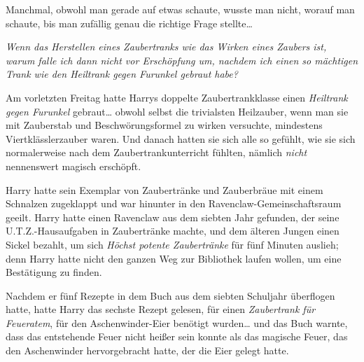 Manchmal, obwohl man gerade auf etwas schaute, wusste man nicht, worauf man schaute, bis man zufällig genau die richtige Frage stellte…

\emph{Wenn das Herstellen eines Zaubertranks wie das Wirken eines Zaubers ist, warum falle ich dann nicht vor Erschöpfung um, nachdem ich einen so mächtigen Trank wie den Heiltrank gegen Furunkel gebraut habe?}

Am vorletzten Freitag hatte Harrys doppelte Zaubertrankklasse einen \emph{Heiltrank gegen Furunkel} gebraut… obwohl selbst die trivialsten Heilzauber, wenn man sie mit Zauberstab und Beschwörungsformel zu wirken versuchte, mindestens Viertklässlerzauber waren. Und danach hatten sie sich alle so gefühlt, wie sie sich normalerweise nach dem Zaubertrankunterricht fühlten, nämlich \emph{nicht} nennenswert magisch erschöpft.

Harry hatte sein Exemplar von Zaubertränke und Zauberbräue mit einem Schnalzen zugeklappt und war hinunter in den Ravenclaw-Gemeinschaftsraum geeilt. Harry hatte einen Ravenclaw aus dem siebten Jahr gefunden, der seine U.T.Z.-Hausaufgaben in Zaubertränke machte, und dem älteren Jungen einen Sickel bezahlt, um sich \emph{Höchst potente Zaubertränke} für fünf Minuten auslieh; denn Harry hatte nicht den ganzen Weg zur Bibliothek laufen wollen, um eine Bestätigung zu finden.

Nachdem er fünf Rezepte in dem Buch aus dem siebten Schuljahr überflogen hatte, hatte Harry das sechste Rezept gelesen, für einen \emph{Zaubertrank für Feueratem}, für den Aschenwinder-Eier benötigt wurden… und das Buch warnte, dass das entstehende Feuer nicht heißer sein konnte als das magische Feuer, das den Aschenwinder hervorgebracht hatte, der die Eier gelegt hatte.

